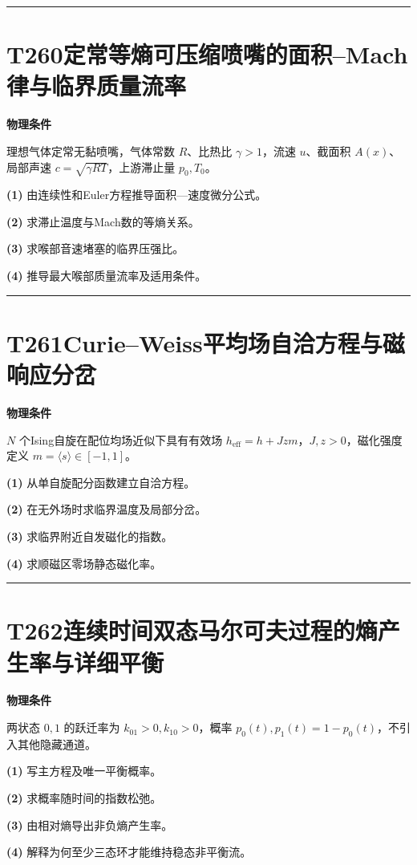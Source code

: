\documentclass[UTF8,a4paper,11pt,oneside,openany]{ctexbook}
\begin{document}
\par\bigskip\hrule\bigskip
\section*{T260\quad 定常等熵可压缩喷嘴的面积–Mach律与临界质量流率}
\textbf{物理条件}\par 理想气体定常无黏喷嘴，气体常数 \(R\)、比热比 \(\gamma>1\)，流速 \(u\)、截面积 \(A(x)\)、局部声速 \(c=\sqrt{\gamma RT}\)，上游滞止量 \(p_0,T_0\)。
\par\noindent\textbf{(1)} 由连续性和Euler方程推导面积—速度微分公式。
\par\noindent\textbf{(2)} 求滞止温度与Mach数的等熵关系。
\par\noindent\textbf{(3)} 求喉部音速堵塞的临界压强比。
\par\noindent\textbf{(4)} 推导最大喉部质量流率及适用条件。

\par\bigskip\hrule\bigskip
\section*{T261\quad Curie–Weiss平均场自洽方程与磁响应分岔}
\textbf{物理条件}\par \(N\) 个Ising自旋在配位均场近似下具有有效场 \(h_{\mathrm{eff}}=h+Jzm\)，\(J,z>0\)，磁化强度定义 \(m=\langle s\rangle\in[-1,1]\)。
\par\noindent\textbf{(1)} 从单自旋配分函数建立自洽方程。
\par\noindent\textbf{(2)} 在无外场时求临界温度及局部分岔。
\par\noindent\textbf{(3)} 求临界附近自发磁化的指数。
\par\noindent\textbf{(4)} 求顺磁区零场静态磁化率。

\par\bigskip\hrule\bigskip
\section*{T262\quad 连续时间双态马尔可夫过程的熵产生率与详细平衡}
\textbf{物理条件}\par 两状态 \(0,1\) 的跃迁率为 \(k_{01}>0,k_{10}>0\)，概率 \(p_0(t),p_1(t)=1-p_0(t)\)，不引入其他隐藏通道。
\par\noindent\textbf{(1)} 写主方程及唯一平衡概率。
\par\noindent\textbf{(2)} 求概率随时间的指数松弛。
\par\noindent\textbf{(3)} 由相对熵导出非负熵产生率。
\par\noindent\textbf{(4)} 解释为何至少三态环才能维持稳态非平衡流。
\end{document}
